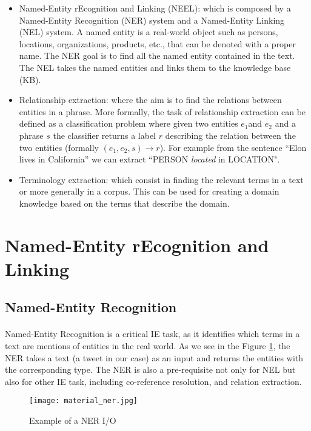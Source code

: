 \begin{itemize}[itemsep = 0.1em]
\item Named-Entity rEcognition and Linking (NEEL): which is composed by a Named-Entity Recognition (NER) system and a Named-Entity Linking (NEL) system. A named entity is a real-world object such as persons, locations, organizations, products, etc., that can be denoted with a proper name. The NER goal is to find all the named entity contained in the text. The NEL takes the named entities and links them to the knowledge base (KB).

\item Relationship extraction: where the aim is to find the relations between entities in a phrase. More formally, the task of relationship extraction can be defined as a classification problem where given two entities \(e_1\)and \(e_2\) and a phrase \(s\) the classifier returns a label \(r\) describing the relation between the two entities (formally \((e_1, e_2, s)\rightarrow r\)). For example from the sentence ``Elon lives in California'' we can extract ``PERSON \textit{located} in LOCATION".

\item Terminology extraction: which consist in finding the relevant terms in a text or more generally in a corpus. This can be used for creating a domain knowledge based on the terms that describe the domain.
\end{itemize}

\section{Named-Entity rEcognition and Linking}

\subsection{Named-Entity Recognition}
\paragraph{}
Named-Entity Recognition is a critical IE task, as it identifies which terms in a text are mentions of entities in the real world.
As we see in the Figure \ref{fig:ner_io}, the NER takes a text (a tweet in our case) as an input and returns the entities with the corresponding type. The NER is also a pre-requisite not only for NEL but also for other IE task, including co-reference resolution, and relation extraction.

\begin{figure}[ht]
\texttt{[image: material\_ner.jpg]}
\caption{Example of a NER I/O}
\label{fig:ner_io}
\end{figure}
\vspace{-10pt}

